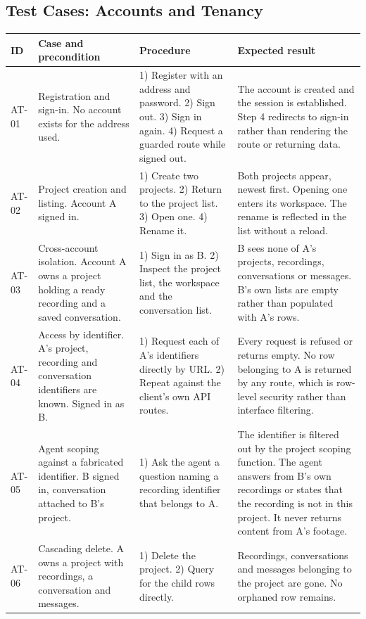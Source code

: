\subsection{Test Cases: Accounts and Tenancy}

\begin{table}[htbp]
\centering
\footnotesize
\begin{tabularx}{\textwidth}{@{}L{0.9cm}L{3.2cm}XX@{}}
\toprule
\textbf{ID} & \textbf{Case and precondition} & \textbf{Procedure} & \textbf{Expected result} \\
\midrule

AT-01 & Registration and sign-in. No account exists for the address used. &
1) Register with an address and password. 2) Sign out. 3) Sign in again. 4) Request a
guarded route while signed out. &
The account is created and the session is established. Step 4 redirects to sign-in
rather than rendering the route or returning data. \\

AT-02 & Project creation and listing. Account A signed in. &
1) Create two projects. 2) Return to the project list. 3) Open one. 4) Rename it. &
Both projects appear, newest first. Opening one enters its workspace. The rename is
reflected in the list without a reload. \\

AT-03 & Cross-account isolation. Account A owns a project holding a ready recording and
a saved conversation. &
1) Sign in as B. 2) Inspect the project list, the workspace and the conversation list. &
B sees none of A's projects, recordings, conversations or messages. B's own lists are
empty rather than populated with A's rows. \\

AT-04 & Access by identifier. A's project, recording and conversation identifiers are
known. Signed in as B. &
1) Request each of A's identifiers directly by URL. 2) Repeat against the client's own
API routes. &
Every request is refused or returns empty. No row belonging to A is returned by any
route, which is row-level security rather than interface filtering. \\

AT-05 & Agent scoping against a fabricated identifier. B signed in, conversation
attached to B's project. &
1) Ask the agent a question naming a recording identifier that belongs to A. &
The identifier is filtered out by the project scoping function. The agent answers from
B's own recordings or states that the recording is not in this project. It never
returns content from A's footage. \\

AT-06 & Cascading delete. A owns a project with recordings, a conversation and messages. &
1) Delete the project. 2) Query for the child rows directly. &
Recordings, conversations and messages belonging to the project are gone. No orphaned
row remains. \\

\bottomrule
\end{tabularx}
\end{table}

